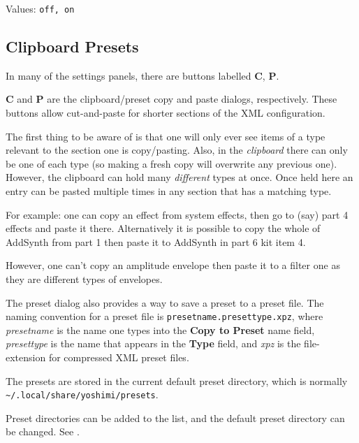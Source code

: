    Values:  \texttt{off, on}

\subsection{Clipboard Presets}
\label{subsec:clipboard_presets}

   In many of the settings panels, there are buttons
   labelled \textbf{C}, \textbf{P}.


   \textbf{C} and \textbf{P} are the clipboard/preset copy and paste
   dialogs, respectively.
   These buttons allow cut-and-paste for shorter sections of the XML
   configuration.

   The first thing to be aware of is that one will only ever see items of a type
   relevant to the section one is copy/pasting. Also, in the \textsl{clipboard}
   there can only be one of each type (so making a fresh copy will overwrite any
   previous one). However, the clipboard can hold many \textsl{different} types at
   once. Once held here an entry can be pasted multiple times in any section that
   has a matching type.

   For example: one can copy an effect from system effects, then go to (say) part 4
   effects and paste it there. Alternatively it is possible to copy the whole of
   AddSynth from part 1 then paste it to AddSynth in part 6 kit item 4.

   However, one can't copy an amplitude envelope then paste it to a filter one as
   they are different types of envelopes.

   The preset dialog also provides a way
   to save a preset to a preset file.
   The naming convention for a preset file is
   \texttt{presetname.presettype.xpz}, where
   \textsl{presetname} is the name one types into the \textbf{Copy to Preset}
   name field, \textsl{presettype} is the name that appears in the
   \textbf{Type} field, and \textsl{xpz} is the file-extension for compressed
   XML preset files.

   The presets are stored in the current default preset directory,
   which is normally\\
   \texttt{\textasciitilde/.local/share/yoshimi/presets}.

   Preset directories can be added to the list, and
   the default preset directory can be changed.
   See .

